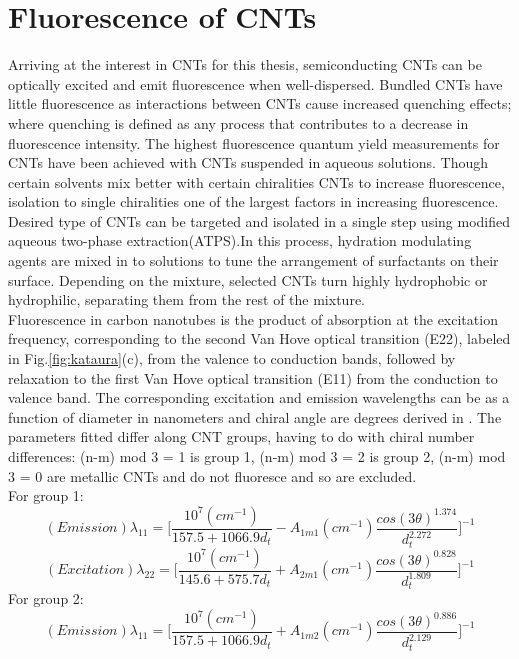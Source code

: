 \section{Fluorescence of CNTs}
Arriving at the interest in CNTs for this thesis, semiconducting CNTs can be optically excited and emit fluorescence\cite{hendler} when well-dispersed. Bundled CNTs have little fluorescence as interactions between CNTs cause increased quenching effects; where quenching is defined as any process that contributes to a decrease in fluorescence intensity. The highest fluorescence quantum yield measurements for CNTs have been achieved with CNTs suspended in aqueous solutions. Though certain solvents mix better with certain chiralities CNTs to increase fluorescence, isolation to single chiralities one of the largest factors in increasing fluorescence. Desired type of CNTs can be targeted and isolated in a single step using modified aqueous two-phase extraction(ATPS)\cite{turek}.In this process, hydration modulating agents are mixed in to solutions to tune the arrangement of surfactants on their surface. Depending on the mixture, selected CNTs turn highly hydrophobic or hydrophilic, separating them from the rest of the mixture.\\
Fluorescence in carbon nanotubes is the product of absorption at the excitation frequency, corresponding to the second Van Hove optical transition (E22), labeled in Fig.\ref{fig:kataura}(c), from the valence to conduction bands, followed by relaxation to the first Van Hove optical transition (E11) from the conduction to valence band. The corresponding excitation and emission  wavelengths can be as a function of diameter in nanometers and chiral angle are degrees derived in \cite{bachilo}. The parameters fitted differ along CNT groups, having to do with chiral number differences:  (n-m) mod 3 = 1 is group 1, (n-m) mod 3 = 2 is group 2,  (n-m) mod 3 = 0 are metallic CNTs and do not fluoresce and so are excluded. \\
For group 1:
\begin{equation}
	(Emission)\lambda_{11} = \Bigg[\frac{10^7(cm^{-1})}{157.5+1066.9d_t} - A_{1m1}(cm^{-1})\frac{cos(3\theta)^{1.374}}{d_t^{2.272}} \Bigg]^{-1}
\end{equation}
\begin{equation}
	(Excitation)\lambda_{22} = \Bigg[\frac{10^7(cm^{-1})}{145.6+575.7d_t} + A_{2m1}(cm^{-1})\frac{cos(3\theta)^{0.828}}{d_t^{1.809}} \Bigg]^{-1}
\end{equation}
For group 2:
\begin{equation}
	(Emission)\lambda_{11} = \Bigg[\frac{10^7(cm^{-1})}{157.5+1066.9d_t} + A_{1m2}(cm^{-1})\frac{cos(3\theta)^{0.886}}{d_t^{2.129}} \Bigg]^{-1}
\end{equation}
